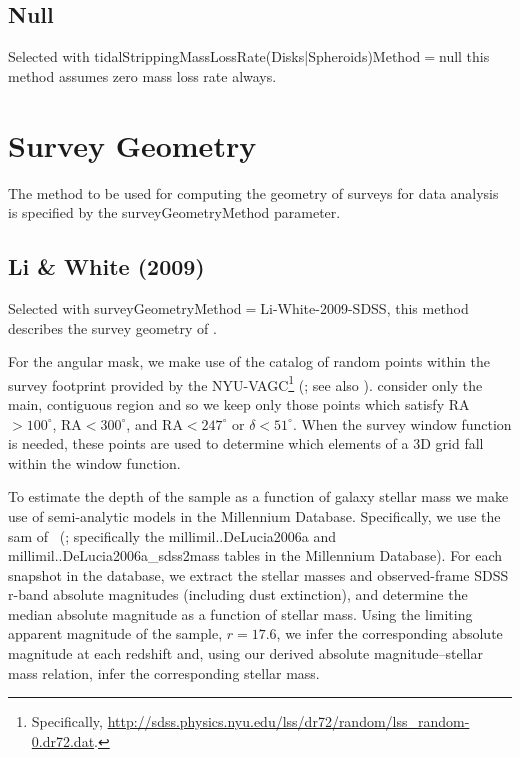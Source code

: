 \subsection{Null}

Selected with {\normalfont \ttfamily tidalStrippingMassLossRate(Disks|Spheroids)Method}$=${\normalfont \ttfamily null} this method assumes zero mass loss rate always.

\section{Survey Geometry}

The method to be used for computing the geometry of surveys for data analysis is specified by the {\normalfont \ttfamily surveyGeometryMethod} parameter.

\subsection{Li \& White (2009)}

Selected with {\normalfont \ttfamily surveyGeometryMethod}$=${\normalfont \ttfamily Li-White-2009-SDSS}, this method describes the survey geometry of \cite{li_distribution_2009}. 

For the angular mask, we make use of the catalog of random points within the survey footprint provided by the NYU-VAGC\footnote{Specifically, \href{http://sdss.physics.nyu.edu/lss/dr72/random/lss_random-0.dr72.dat}{http://sdss.physics.nyu.edu/lss/dr72/random/lss\_random-0.dr72.dat}.} (\citealt{blanton_new_2005}; see also \citealt{adelman-mccarthy_sixth_2008,padmanabhan_improved_2008}). \cite{li_distribution_2009} consider only the main, contiguous region and so we keep only those points which satisfy RA$>100^\circ$, RA$<300^\circ$, and RA$<247^\circ$ or $\delta< 51^\circ$. When the survey window function is needed, these points are used to determine which elements of a 3D grid fall within the window function.

To estimate the depth of the \cite{li_distribution_2009} sample as a function of galaxy stellar mass we make use of semi-analytic models in the Millennium Database. Specifically, we use the \gls{sam} of \citeauthor{de_lucia_hierarchical_2007}~(\citeyear{de_lucia_hierarchical_2007}; specifically the {\normalfont \ttfamily millimil..DeLucia2006a} and {\normalfont \ttfamily millimil..DeLucia2006a\_sdss2mass} tables in the Millennium Database). For each snapshot in the database, we extract the stellar masses and observed-frame SDSS r-band absolute magnitudes (including dust extinction), and determine the median absolute magnitude as a function of stellar mass. Using the limiting apparent magnitude of the \cite{li_distribution_2009} sample, $r=17.6$, we infer the corresponding absolute magnitude at each redshift and, using our derived absolute magnitude--stellar mass relation, infer the corresponding stellar mass.

